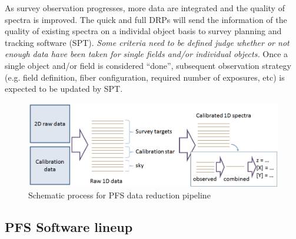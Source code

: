 \documentclass[a4paper,notitlepage]{article}
\begin{document}
As survey observation progresses, more data are integrated and the
quality of spectra is improved. The quick and full DRPs will send the
information of the quality of existing spectra on a individal object
basis to survey planning and tracking software (SPT). {\it Some criteria
need to be defined judge whether or not enough data have been taken for
single fields and/or individual objects.} Once a single object and/or
field is considered ``done'', subsequent observation strategy
(e.g. field definition, fiber configuration, required number of
exposures, etc) is expected to be updated by SPT.

\begin{figure}[htb]
  \begin{center}
    \includegraphics[width=.75\linewidth]{sciops-scireq-drp-slide.png}
  \end{center}
  \caption{Schematic process for PFS data reduction pipeline}
  \label{fig:sciops-scireq-drp-slide}
\end{figure}

\subsection{PFS Software lineup}
\end{document}
